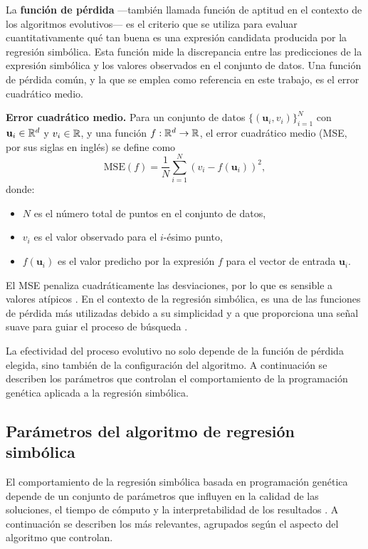 La \textbf{función de pérdida} ---también llamada función de aptitud en el contexto de los algoritmos evolutivos--- es el criterio que se utiliza para evaluar cuantitativamente qué tan buena es una expresión candidata producida por la regresión simbólica. Esta función mide la discrepancia entre las predicciones de la expresión simbólica y los valores observados en el conjunto de datos. Una función de pérdida común, y la que se emplea como referencia en este trabajo, es el error cuadrático medio.

\textbf{Error cuadrático medio.} Para un conjunto de datos \(\{(\mathbf{u}_i, v_i)\}_{i=1}^{N}\) con \(\mathbf{u}_i \in \mathbb{R}^d\) y \(v_i \in \mathbb{R}\), y una función \(f: \mathbb{R}^d \to \mathbb{R}\), el error cuadrático medio (MSE, por sus siglas en inglés) se define como \begin{equation} \text{MSE}(f) = \frac{1}{N} \sum_{i=1}^{N} \left( v_i - f(\mathbf{u}_i) \right)^2, \end{equation} donde: \begin{itemize} \item \(N\) es el número total de puntos en el conjunto de datos, \item \(v_i\) es el valor observado para el \(i\)-ésimo punto, \item \(f(\mathbf{u}_i)\) es el valor predicho por la expresión \(f\) para el vector de entrada \(\mathbf{u}_i\). \end{itemize} El MSE penaliza cuadráticamente las desviaciones, por lo que es sensible a valores atípicos \cite{hastie2009elements}. En el contexto de la regresión simbólica, es una de las funciones de pérdida más utilizadas debido a su simplicidad y a que proporciona una señal suave para guiar el proceso de búsqueda \cite{bishop2006pattern}.

La efectividad del proceso evolutivo no solo depende de la función de pérdida elegida, sino también de la configuración del algoritmo. A continuación se describen los parámetros que controlan el comportamiento de la programación genética aplicada a la regresión simbólica.

\subsection{Parámetros del algoritmo de regresión simbólica}

El comportamiento de la regresión simbólica basada en programación genética depende de un conjunto de parámetros que influyen en la calidad de las soluciones, el tiempo de cómputo y la interpretabilidad de los resultados \cite{cranmer2023pysr}. A continuación se describen los más relevantes, agrupados según el aspecto del algoritmo que controlan.


